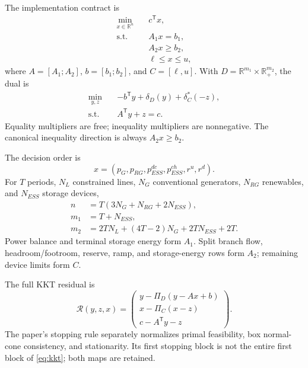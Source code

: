 \documentclass[10pt,journal]{IEEEtran}
\newcommand{\R}{\mathbb{R}}
\begin{document}
The implementation contract is
\begin{equation}
\begin{aligned}
\min_{x\in\R^n}\quad & c^{\mathsf T}x,\\
\mathrm{s.t.}\quad & A_1x=b_1,\\
& A_2x\ge b_2,\\
& \ell\le x\le u,
\end{aligned}
\label{eq:primal}
\end{equation}
where $A=[A_1;A_2]$, $b=[b_1;b_2]$, and $C=[\ell,u]$. With
$D=\R^{m_1}\times\R_+^{m_2}$, the dual is
\begin{equation}
\begin{aligned}
\min_{y,z}\quad &-b^{\mathsf T}y+\delta_D(y)+\delta_C^*(-z),\\
\mathrm{s.t.}\quad &A^{\mathsf T}y+z=c.
\end{aligned}
\label{eq:dual}
\end{equation}
Equality multipliers are free; inequality multipliers are nonnegative. The
canonical inequality direction is always $A_2x\ge b_2$.

The decision order is
\begin{equation}
x=(p_G,p_{RG},p_{ESS}^{dc},p_{ESS}^{ch},r^u,r^d).
\end{equation}
For $T$ periods, $N_L$ constrained lines, $N_G$ conventional generators,
$N_{RG}$ renewables, and $N_{ESS}$ storage devices,
\begin{align}
n &= T(3N_G+N_{RG}+2N_{ESS}),\\
m_1 &= T+N_{ESS},\\
m_2 &= 2TN_L+(4T-2)N_G+2TN_{ESS}+2T.
\end{align}
Power balance and terminal storage energy form $A_1$. Split branch flow,
headroom/footroom, reserve, ramp, and storage-energy rows form $A_2$; remaining
device limits form $C$.

The full KKT residual is
\begin{equation}
\mathcal{R}(y,z,x)=
\begin{pmatrix}
y-\Pi_D(y-Ax+b)\\
x-\Pi_C(x-z)\\
c-A^{\mathsf T}y-z
\end{pmatrix}.
\label{eq:kkt}
\end{equation}
The paper's stopping rule separately normalizes primal feasibility, box
normal-cone consistency, and stationarity. Its first stopping block is not the
entire first block of \eqref{eq:kkt}; both maps are retained.
\end{document}
